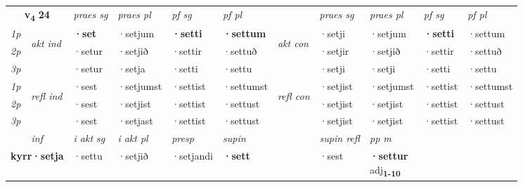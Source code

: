 \noindent
\begin{tabular}{lllllllllll} \toprule
\multicolumn{2}{c}{\textbf{v{\textsubscript{4}}} \Large{\textbf{24}}}  &  \textit{praes sg}  & \textit{praes pl}  &\textit{ pf sg} & \textit{pf pl} &  &  \textit{praes sg}  & \textit{praes pl}  & \textit{pf sg} & \textit{pf pl } \\*
	\cmidrule{3-6} \cmidrule{8-11}
 {\textit{1p}} & \multirow{3}{*}{\begin{turn}{90}\textit{akt ind}\end{turn}} & \textbf{·set} & ·setjum & \textbf{·setti} & \textbf{·settum} & \multirow{3}{*}{\begin{turn}{90}\textit{akt con}\end{turn}} &·setji & ·setjum & \textbf{·setti} & ·settum\\*
 {\textit{2p}} &  &  ·setur  & ·setjið & ·settir & ·settuð & & ·setjir & ·setjið & ·settir & ·settuð \\*
{\textit{3p}} &  & ·setur & ·setja & ·setti & ·settu & & ·setji & ·setji& ·setti & ·settu \\*
\cmidrule{3-6} \cmidrule{8-11}
 {\textit{1p}} & \multirow{3}{*}{\begin{turn}{90}\textit{refl ind}\end{turn}}  & ·sest & ·setjumst & ·settist & ·settumst & \multirow{3}{*}{\begin{turn}{90}\textit{refl con}\end{turn}}  &·setjist & ·setjumst & ·settist & ·settumst \\*
 {\textit{2p}} &  & ·sest & ·setjist & ·settist & ·settust & &·setjist & ·setjist & ·settist & ·settust \\*
 {\textit{3p}}  & & ·sest & ·setjast & ·settist & ·settust & & ·setjist & ·setjist& ·settist & ·settust \\*
\cmidrule{3-6} \cmidrule{8-11}

   \multicolumn{2}{c}{\textit{inf}}  & \textit{i akt sg} & \textit{i akt pl}   & \textit{presp} & \textit{supin} && \textit{supin refl} & \textit{pp m} \\*
  \multicolumn{2}{c}{\textbf{kyrr\allowbreak ·setja}} & ·settu  & ·setjið   & ·setjandi &  \textbf{·sett} && ·sest & \specialcell{\textbf{·settur} \\ adj\textbf{\textsubscript{1-10}}} \\*
\end{tabular}

